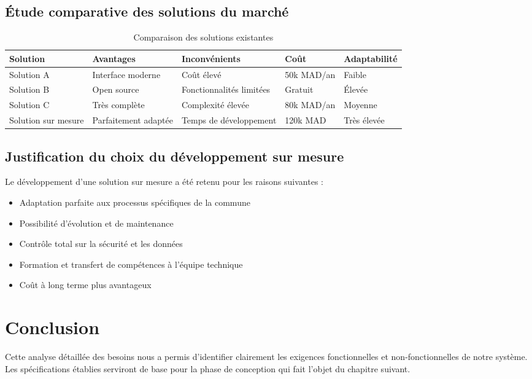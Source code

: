 \subsection{Étude comparative des solutions du marché}

\begin{table}[h]
\centering
\scriptsize
\begin{tabular}{|p{2cm}|p{2cm}|p{2cm}|p{2cm}|p{2cm}|}
\hline
\textbf{Solution} & \textbf{Avantages} & \textbf{Inconvénients} & \textbf{Coût} & \textbf{Adaptabilité} \\
\hline
Solution A & Interface moderne & Coût élevé & 50k MAD/an & Faible \\
\hline
Solution B & Open source & Fonctionnalités limitées & Gratuit & Élevée \\
\hline
Solution C & Très complète & Complexité élevée & 80k MAD/an & Moyenne \\
\hline
Solution sur mesure & Parfaitement adaptée & Temps de développement & 120k MAD & Très élevée \\
\hline
\end{tabular}
\caption{Comparaison des solutions existantes}
\label{tab:solutions_comparison}
\end{table}

\subsection{Justification du choix du développement sur mesure}

Le développement d'une solution sur mesure a été retenu pour les raisons suivantes :
\begin{itemize}
    \item Adaptation parfaite aux processus spécifiques de la commune
    \item Possibilité d'évolution et de maintenance
    \item Contrôle total sur la sécurité et les données
    \item Formation et transfert de compétences à l'équipe technique
    \item Coût à long terme plus avantageux
\end{itemize}

\section{Conclusion}

Cette analyse détaillée des besoins nous a permis d'identifier clairement les exigences fonctionnelles et non-fonctionnelles de notre système. Les spécifications établies serviront de base pour la phase de conception qui fait l'objet du chapitre suivant.

